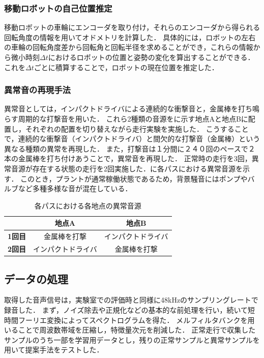 \documentclass[../main]{subfiles}
\begin{document}
\subsubsection{移動ロボットの自己位置推定}
移動ロボットの車輪にエンコーダを取り付け，それらのエンコーダから得られる回転角度の情報を用いてオドメトリを計算した．
具体的には，ロボットの左右の車輪の回転角度差から回転角と回転半径を求めることができ，これらの情報から微小時刻$\Delta t$におけるロボットの位置と姿勢の変化を算出することができる．
これを$\Delta t$ごとに積算することで，ロボットの現在位置を推定した．

\subsubsection{異常音の再現手法}
異常音としては，インパクトドライバによる連続的な衝撃音と，金属棒を打ち鳴らす周期的な打撃音を用いた．
これら2種類の音源をに示す地点Aと地点Bに配置し，それぞれの配置を切り替えながら走行実験を実施した．
こうすることで，連続的な衝撃音（インパクトドライバ）と間欠的な打撃音（金属棒）という異なる種類の異常を再現した．
また，打撃音は１分間に２４０回のペースで２本の金属棒を打ち付けあうことで，異常音を再現した．
正常時の走行を3回，異常音源が存在する状態の走行を2回実施した．に各パスにおける異常音源を示す．
このとき，プラントが通常稼働状態であるため，背景騒音にはポンプやバルブなど多種多様な音が混在している．


\begin{table}[htbp]
  \centering
  \caption{各パスにおける各地点の異常音源}
  \label{tab:abnormal_sound_jp}
  \begin{tabular}{c|c|c}
  \hline
   & \textbf{地点A} & \textbf{地点B} \\ \hline
  \textbf{1回目} & 金属棒を打撃 & インパクトドライバ \\
  \textbf{2回目} & インパクトドライバ & 金属棒を打撃 \\ \hline
  \end{tabular}
\end{table}

\subsection{データの処理}
\label{subsec:vexp_ci_processing}
取得した音声信号は，実験室での評価時と同様に48kHzのサンプリングレートで録音した．
まず，ノイズ除去や正規化などの基本的な前処理を行い，続いて短時間フーリエ変換によってスペクトログラムを得た．
メルフィルタバンクを用いることで周波数帯域を圧縮し，特徴量次元を削減した．
正常走行で収集したサンプルのうち一部を学習用データとし，残りの正常サンプルと異常サンプルを用いて提案手法をテストした．
\end{document}
